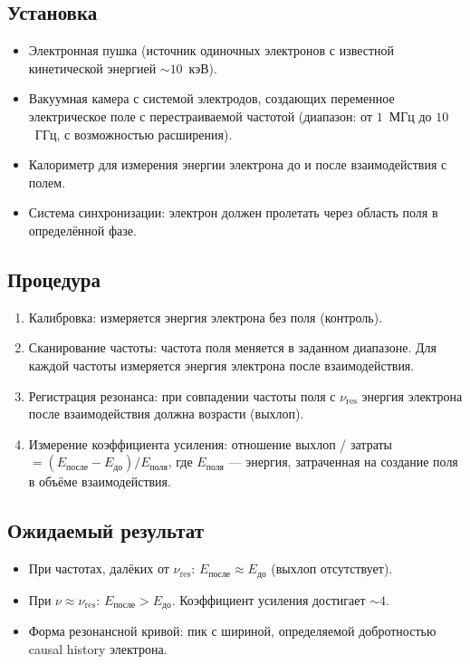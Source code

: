 \documentclass[12pt,a4paper]{article}
\begin{document}
\subsection{Установка}
\begin{itemize}
    \item Электронная пушка (источник одиночных электронов с известной кинетической энергией $\sim 10$~кэВ).
    \item Вакуумная камера с системой электродов, создающих переменное электрическое поле с перестраиваемой частотой (диапазон: от $1$~МГц до $10$~ГГц, с возможностью расширения).
    \item Калориметр для измерения энергии электрона до и после взаимодействия с полем.
    \item Система синхронизации: электрон должен пролетать через область поля в определённой фазе.
\end{itemize}

\subsection{Процедура}
\begin{enumerate}[label=\arabic*.]
    \item Калибровка: измеряется энергия электрона без поля (контроль).
    \item Сканирование частоты: частота поля меняется в заданном диапазоне. Для каждой частоты измеряется энергия электрона после взаимодействия.
    \item Регистрация резонанса: при совпадении частоты поля с $\nu_{\text{res}}$ энергия электрона после взаимодействия должна возрасти (выхлоп).
    \item Измерение коэффициента усиления: отношение выхлоп / затраты $= (E_{\text{после}} - E_{\text{до}}) / E_{\text{поля}}$, где $E_{\text{поля}}$ --- энергия, затраченная на создание поля в объёме взаимодействия.
\end{enumerate}

\subsection{Ожидаемый результат}
\begin{itemize}
    \item При частотах, далёких от $\nu_{\text{res}}$: $E_{\text{после}} \approx E_{\text{до}}$ (выхлоп отсутствует).
    \item При $\nu \approx \nu_{\text{res}}$: $E_{\text{после}} > E_{\text{до}}$. Коэффициент усиления достигает $\sim 4$.
    \item Форма резонансной кривой: пик с шириной, определяемой добротностью causal history электрона.
\end{itemize}
\end{document}
